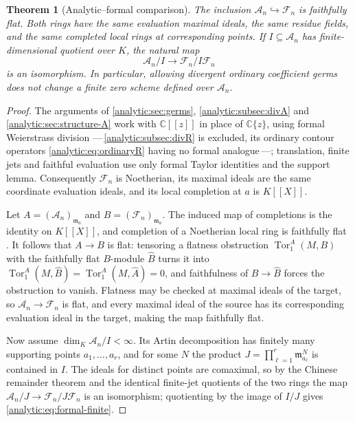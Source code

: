 \documentclass[11pt,letterpaper]{article}
\newtheorem{theorem}{Theorem}[section]
\theoremstyle{definition}
\theoremstyle{remark}
\newcommand{\C}{\mathbb C}
\newcommand{\A}{\mathscr A}
\newcommand{\FF}{\mathscr F}
\newcommand{\m}{\mathfrak m}
\numberwithin{equation}{section}
\begin{document}
\begin{theorem}[Analytic--formal comparison]
\label{analytic:thm:formal-comparison}
The inclusion $\A_n\hookrightarrow\FF_n$ is faithfully flat. Both rings have
the same evaluation maximal ideals, the same residue fields, and the same
completed local rings at corresponding points. If $I\subseteq\A_n$ has
finite-dimensional quotient over $K$, the natural map
\begin{equation}\label{analytic:eq:formal-finite}
 \A_n/I\longrightarrow\FF_n/I\FF_n
\end{equation}
is an isomorphism. In particular, allowing divergent ordinary coefficient
germs does not change a finite zero scheme defined over $\A_n$.
\end{theorem}
\begin{proof}
The arguments of
\cref{analytic:sec:germs}, \cref{analytic:subsec:divA} and
\cref{analytic:sec:structure-A} work with $\C[[z]]$
in place of $\C\{z\}$, using formal Weierstrass division
---\,\cref{analytic:subsec:divR} is excluded, its ordinary contour
operators \eqref{analytic:eq:ordinaryR} having no formal analogue\,---; translation,
finite jets and faithful evaluation use only formal Taylor identities and
the support lemma. Consequently $\FF_n$ is Noetherian, its maximal ideals
are the same coordinate evaluation ideals, and its local completion at $a$
is $K[[X]]$.

Let $A=(\A_n)_{\m_a}$ and $B=(\FF_n)_{\m_a}$. The induced map of
completions is the identity on $K[[X]]$, and completion of a Noetherian
local ring is faithfully flat \cite[tag 00MC]{Stacks}. It follows that
$A\to B$ is flat: tensoring a flatness obstruction
$\operatorname{Tor}_1^A(M,B)$ with the faithfully flat $B$-module
$\widehat B$ turns it into
$\operatorname{Tor}_1^A(M,\widehat B)=\operatorname{Tor}_1^A(M,\widehat A)=0$,
and faithfulness of $B\to\widehat B$ forces the obstruction to vanish.
Flatness may be checked at maximal ideals of the target, so
$\A_n\to\FF_n$ is flat, and every maximal ideal of the source has its
corresponding evaluation ideal in the target, making the map faithfully
flat.

Now assume $\dim_K\A_n/I<\infty$. Its Artin decomposition has finitely many
supporting points $a_1,\ldots,a_r$, and for some $N$ the product
$J=\prod_{\ell=1}^r\m_{a_\ell}^N$ is contained in $I$. The ideals for
distinct points are comaximal, so by the Chinese remainder theorem and the
identical finite-jet quotients of the two rings the map
$\A_n/J\to\FF_n/J\FF_n$ is an isomorphism; quotienting by the image of
$I/J$ gives \eqref{analytic:eq:formal-finite}.
\end{proof}
\end{document}
